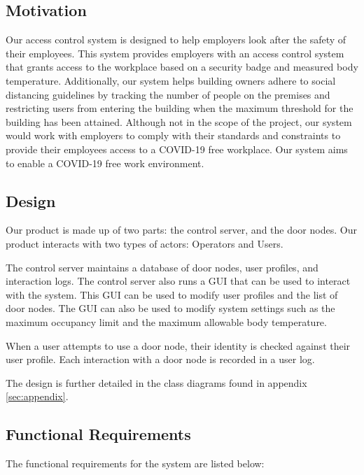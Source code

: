 
\subsection{Motivation}

Our access control system is designed to help employers look after the safety
of their employees.  This system provides employers with an access control
system that grants access to the workplace based on a security badge and
measured body temperature.  Additionally, our system helps building owners
adhere to social distancing guidelines by tracking the number of people on the
premises and restricting users from entering the building when the maximum
threshold for the building has been attained.  Although not in the scope of the
project, our system would work with employers to comply with their standards
and constraints to provide their employees access to a COVID-19 free workplace.
Our system aims to enable a COVID-19 free work environment.


\subsection{Design}

Our product is made up of two parts: the control server, and the door nodes.
Our product interacts with two types of actors: Operators and Users.

The control server maintains a database of door nodes, user profiles, and
interaction logs.  The control server also runs a GUI that can be used to
interact with the system. This GUI can be used to modify user profiles and the
list of door nodes. The GUI can also be used to modify system settings such as
the maximum occupancy limit and the maximum allowable body temperature.

When a user attempts to use a door node, their identity is checked against
their user profile.  Each interaction with a door node is recorded in a user
log.

The design is further detailed in the class diagrams found in appendix
\ref{sec:appendix}.

\subsection{Functional Requirements}

The  functional requirements for the system are listed below:

